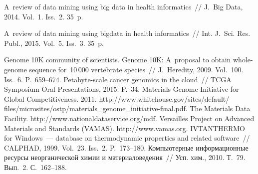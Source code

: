 \begin{multicols}{2}
{{\begin{thebibliography}{99}
 A~review of data mining using big data in health 
informatics~// J.~Big Data, 2014. Vol.~1. Iss.~2. 35~p.

 A~review of data mining using bigdata in health 
informatics~// Int. J.~Sci. Res. Publ., 2015. Vol.~5. Iss.~3. 35~p.

Genome 10K community of scientists. Genome 10K: A~proposal to obtain whole-genome sequence 
for~10\,000 vertebrate species~// J.~Heredity, 2009. Vol.~100. Iss.~6. P.~659--674.
 Petabyte-scale cancer genomics in the 
cloud~// TCGA Symposium  Oral Presentations, 2015. P.~34.
Materials Genome Initiative for Global Competitiveness. 2011. {\sf 
http://www.whitehouse.gov/sites/default/ \linebreak 
files/microsites/ostp/materials\_genome\_initiative-final.pdf}.
The Materials Data Facility. {\sf http://www.\linebreak nationaldataservice.org/mdf}.
Versailles Project on Advanced Materials and Standards (VAMAS). http://www.vamas.org.
 IVTANTHERMO for Windows~--- database on 
thermodynamic properties and related software~// CALPHAD, 1999. Vol.~23. Iss.~2. P.~173--180.
Компьютерные информационные ресурсы неорганической химии и материаловедения~//
Усп. хим., 2010. Т.~79. Вып.~2. С.~162--188.


\end{thebibliography}}}
\end{multicols}
